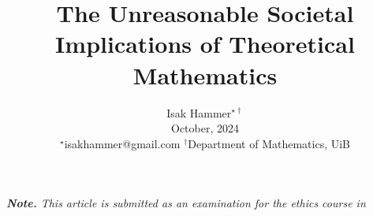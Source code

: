 \documentclass[10pt,twocolumn]{article}
\title{ {\Large \textbf{The Unreasonable Societal Implications of Theoretical Mathematics   }} }
\begin{document}
\author{
Isak Hammer$^{\star\dagger}$  \\
{\small  October, 2024}\\
{\footnotesize $^\star$isakhammer@gmail.com }
{\footnotesize $^\dagger$Department of Mathematics, UiB}\\
}

\maketitle
\begin{sloppy}
 \textit{ \textbf{Note.} This article is submitted as an examination for the ethics course in   \\}






\end{sloppy}
\end{document}
